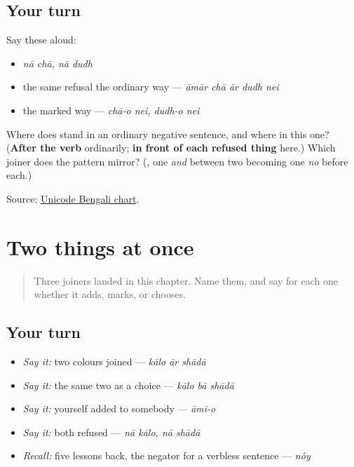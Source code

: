 \subsection*{Your turn}
Say these aloud:

\begin{itemize}
\raggedright
  \item \emph{nā chā, nā dudh}
  \item the same refusal the ordinary way — \emph{āmār chā ār dudh nei}
  \item the marked way — \emph{chā-o nei, dudh-o nei}
\end{itemize}

\begin{tcolorbox}[breakable,colback=teal!4,colframe=teal!35!black,title={Before you move on}]
Where does \textbf{} stand in an ordinary negative sentence, and where in this one? (\textbf{After the verb} ordinarily; \textbf{in front of each refused thing} here.) Which joiner does the pattern mirror? (\textbf{}, one \emph{and} between two becoming one \emph{no} before each.)

Source: \href{https://www.unicode.org/charts/PDF/U0980.pdf}{Unicode Bengali chart}.
\end{tcolorbox}
\section[\texorpdfstring{\bn{আর} · \bn{ও} · \bn{বা} (ār · -o · bā)}{আর · ও · বা (ār · -o · bā)}]{Two things at once}

\label{lesson:BN-R17-joined-and-refused}



\begin{quote}
Three joiners landed in this chapter. Name them, and say for each one whether it adds, marks, or chooses.
\end{quote}

\subsection*{Your turn}
\begin{itemize}
\raggedright
  \item \emph{Say it:} two colours joined — \emph{kālo ār shādā}
  \item \emph{Say it:} the same two as a choice — \emph{kālo bā shādā}
  \item \emph{Say it:} yourself added to somebody — \emph{āmi-o}
  \item \emph{Say it:} both refused — \emph{nā kālo, nā shādā}
  \item \emph{Recall:} five lessons back, the negator for a verbless sentence — \emph{nôy}
\end{itemize}

